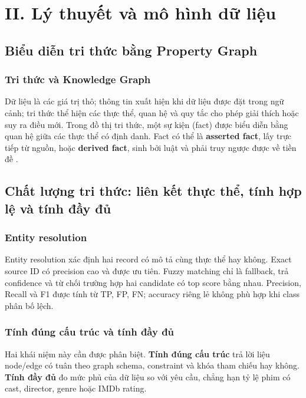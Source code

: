 \chapter{II. Lý thuyết và mô hình dữ liệu}

\section{Biểu diễn tri thức bằng Property Graph}

\subsection{Tri thức và Knowledge Graph}

Dữ liệu là các giá trị thô; thông tin xuất hiện khi dữ liệu được đặt trong ngữ
cảnh; tri thức thể hiện các thực thể, quan hệ và quy tắc cho phép giải thích hoặc
suy ra điều mới. Trong đồ thị tri thức, một sự kiện (fact) được biểu diễn bằng quan hệ giữa
các thực thể có định danh. Fact có thể là \textbf{asserted fact}, lấy trực tiếp từ nguồn,
hoặc \textbf{derived fact}, sinh bởi luật và phải truy ngược được về tiền đề \cite{hogan2021knowledge}.

\section{Chất lượng tri thức: liên kết thực thể, tính hợp lệ và tính đầy đủ}

\subsection{Entity resolution}

Entity resolution xác định hai record có mô tả cùng thực thể hay không. Exact
source ID có precision cao và được ưu tiên. Fuzzy matching chỉ là fallback, trả
confidence và từ chối trường hợp hai candidate có top score bằng nhau. Precision,
Recall và F1 được tính từ TP, FP, FN; accuracy riêng lẻ không phù hợp khi class
phân bố lệch.

\subsection{Tính đúng cấu trúc và tính đầy đủ}

Hai khái niệm này cần được phân biệt. \textbf{Tính đúng cấu trúc} trả lời liệu node/edge
có tuân theo graph schema, constraint và khóa tham chiếu hay không.
\textbf{Tính đầy đủ} đo mức phủ của dữ liệu so với yêu cầu, chẳng hạn tỷ lệ phim
có cast, director, genre hoặc IMDb rating.


